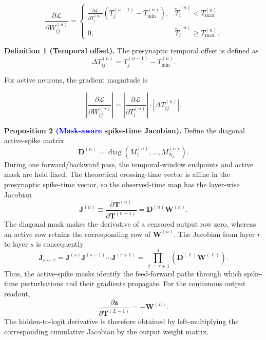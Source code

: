 \documentclass[12pt]{article}
\newcommand{\rev}[1]{\textcolor{blue}{#1}}
\begin{document}
 \begin{equation}
\frac{\partial \mathcal{L}}{\partial W_{ij}^{(n)}} =
\begin{cases}
\displaystyle
\frac{\partial \mathcal{L}}{\partial T_i^{(n)}}
\left(
T_j^{(n-1)} - T_{\min}^{(n)}
\right),
& \tilde{T}_i^{(n)} < T_{\max}^{(n)} \\[1.0ex]
0,
& \tilde{T}_i^{(n)} \ge T_{\max}^{(n)}.
\end{cases}
\label{eq:supp_gradient_piecewise}
\end{equation}

\textbf{Definition 1 (Temporal offset).}
The presynaptic temporal offset is defined as
\[
\Delta T_{ij}^{(n)} = T_j^{(n-1)} - T_{\min}^{(n)}.
\]

For active neurons, the gradient magnitude is

 \[
\left|
\frac{\partial \mathcal{L}}{\partial W_{ij}^{(n)}}
\right|
=
\left|
\frac{\partial \mathcal{L}}{\partial T_i^{(n)}}
\right|
\cdot
|\Delta T_{ij}^{(n)}|.
\]

\textbf{Proposition 2 \rev{(Mask-aware} spike-time Jacobian).}
 Define the diagonal active-spike matrix
\[
\mathbf{D}^{(n)}=\operatorname{diag}\!\left(M_1^{(n)},\ldots,M_{N_n}^{(n)}\right).
\]
 During one forward/backward pass, the temporal-window endpoints and active mask are held fixed. The theoretical crossing-time vector is affine in the presynaptic spike-time vector, so the observed-time map has the layer-wise Jacobian
\begin{equation}
\mathbf{J}^{(n)}
\equiv
\frac{\partial \mathbf{T}^{(n)}}{\partial \mathbf{T}^{(n-1)}}
=
\mathbf{D}^{(n)}\mathbf{W}^{(n)}.
\label{eq:supp_masked_jacobian}
\end{equation}
 The diagonal mask makes the derivative of a censored output row zero, whereas an active row retains the corresponding row of $\mathbf{W}^{(n)}$. The Jacobian from layer $r$ to layer $s$ is consequently
\begin{equation}
\mathbf{J}_{s\leftarrow r}
=
\mathbf{J}^{(s)}\mathbf{J}^{(s-1)}\cdots\mathbf{J}^{(r+1)}
=
\prod_{\ell=r+1}^{s}\left(\mathbf{D}^{(\ell)}\mathbf{W}^{(\ell)}\right).
\label{eq:supp_cumulative_jacobian}
\end{equation}
 Thus, the active-spike masks identify the feed-forward paths through which spike-time perturbations and their gradients propagate. For the continuous output readout,
\[
\frac{\partial\mathbf{z}}{\partial\mathbf{T}^{(L-1)}}=-\mathbf{W}^{(L)}.
\]
The hidden-to-logit derivative is therefore obtained by left-multiplying the corresponding cumulative Jacobian by the output weight matrix.
\end{document}

